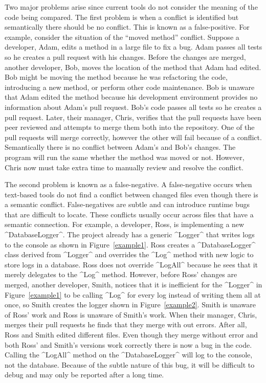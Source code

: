 \documentclass[draftclsnofoot,onecolumn]{IEEEtran}
\begin{document}
Two major problems arise since current tools do not consider the meaning of 
the code being compared. The first problem is when a conflict is identified 
but semantically there should be no conflict. This is known as a 
false-positive. For example, consider the situation of the ``moved method'' 
conflict. Suppose a developer, Adam, edits a method in a large file to fix a 
bug. Adam passes all tests so he creates a pull request with his changes. 
Before the changes are merged, another developer, Bob, moves the location of 
the method that Adam had edited. Bob might be moving the method because he was 
refactoring the code, introducing a new method, or perform other code 
maintenance. Bob is unaware that Adam edited the method because his development 
environment provides no information about Adam's pull request. Bob's code passes 
all tests so he creates a pull request. Later, their manager, Chris, verifies 
that the pull requests have been peer reviewed and attempts to merge them both 
into the repository. One of the pull requests will merge correctly, however the 
other will fail because of a conflict. Semantically there is no conflict between 
Adam's and Bob's changes. The program will run the same whether the method was 
moved or not. However, Chris now must take extra time to manually review and 
resolve the conflict.

The second problem is known as a false-negative. A false-negative occurs when 
text-based tools do not find a conflict between changed files even though 
there is a semantic conflict. False-negatives are subtle and can introduce 
runtime bugs that are difficult to locate. These conflicts usually occur 
across files that have a semantic connection. For example, a developer, Ross, 
is implementing a new ^DatabaseLogger^. The project already has a generic 
^Logger^ that writes logs to the console as shown in Figure~\ref{example1}. 
Ross creates a ^DatabaseLogger^ class derived from ^Logger^ and overrides the 
^Log^ method with new logic to store logs in a database. Ross does not override 
^LogAll^ because he sees that it merely delegates to the ^Log^ method. 
However, before Ross' changes are merged, another developer, Smith, notices 
that it is inefficient for the ^Logger^ in Figure~\ref{example1} to be calling 
^Log^ for every log instead of writing them all at once, so Smith creates the 
logger shown in Figure~\ref{example2}. Smith is unaware of Ross' work and Ross 
is unaware of Smith's work. When their manager, Chris, merges their pull 
requests he finds that they merge with out errors. After all, Ross and Smith 
edited different files. Even though they merge without error and both Ross' 
and Smith's versions work correctly there is now a bug in the code. Calling 
the ^LogAll^ method on the ^DatabaseLogger^ will log to the console, not the 
database. Because of the subtle nature of this bug, it will be difficult 
to debug and may only be reported after a long time.
\end{document}

